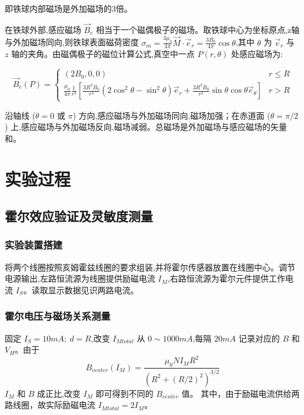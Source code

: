 \documentclass[UTF8]{ctexart}
\begin{document}
    即铁球内部磁场是外加磁场的3倍。
    
    在铁球外部,感应磁场 $\vec{B}_e$ 相当于一个磁偶极子的磁场。取铁球中心为坐标原点,z轴与外加磁场同向,则铁球表面磁荷密度 $\sigma_m=\frac{3\mu_0}{4\pi}\vec{M}\cdot\vec{e}_r=\frac{3B_0}{4\pi}\cos\theta$,其中 $\theta$ 为 $\vec{e}_r$ 与 $z$ 轴的夹角。由磁偶极子的磁位计算公式,真空中一点 $P(r,\theta)$ 处感应磁场为:
    
    \begin{equation}
        \vec{B}_e(P) = 
        \begin{cases}
            (2B_0,0,0) & r \leq R \\
            \frac{\mu_0}{4\pi}\frac{1}{r^3} \left[ \frac{3R^3B_0}{r^3}(2\cos^2\theta-\sin^2\theta)\vec{e}_r + \frac{3R^3B_0}{r^3}\sin\theta\cos\theta\vec{e}_{\theta} \right] & r > R
        \end{cases}  
    \end{equation}
    
    沿轴线 ($\theta=0$ 或 $\pi$) 方向,感应磁场与外加磁场同向,磁场加强；在赤道面 ($\theta=\pi/2$) 上,感应磁场与外加磁场反向,磁场减弱。总磁场是外加磁场与感应磁场的矢量和。


    \section{实验过程}

    \subsection{霍尔效应验证及灵敏度测量}
    
    \subsubsection{实验装置搭建}
    将两个线圈按照亥姆霍兹线圈的要求组装,并将霍尔传感器放置在线圈中心。调节电源输出,左路恒流源为线圈提供励磁电流 $I_M$,右路恒流源为霍尔元件提供工作电流 $I_S$。读取显示数据见识两路电流。
    
    \subsubsection{霍尔电压与磁场关系测量} \label{sec:hall_effect_Im}
    固定 $I_S=10mA;\ d=R$,改变 $I_{Mtotal}$ 从 $0\sim1000mA$,每隔 $20mA$ 记录对应的 $B$ 和 $V_H$。由于
    \begin{equation}
        B_{center}(I_M) = \frac{\mu_0 N I_M R^2}{(R^2+(R/2)^2)^{3/2}} 
    \end{equation}
    $I_M$ 和 $B$ 成正比,改变 $I_M$ 即可得到不同的 $B_{center}$ 值。
    其中，由于励磁电流供给两路线圈，故实际励磁电流 $I_{Mtotal}=2I_M$。
\end{document}
